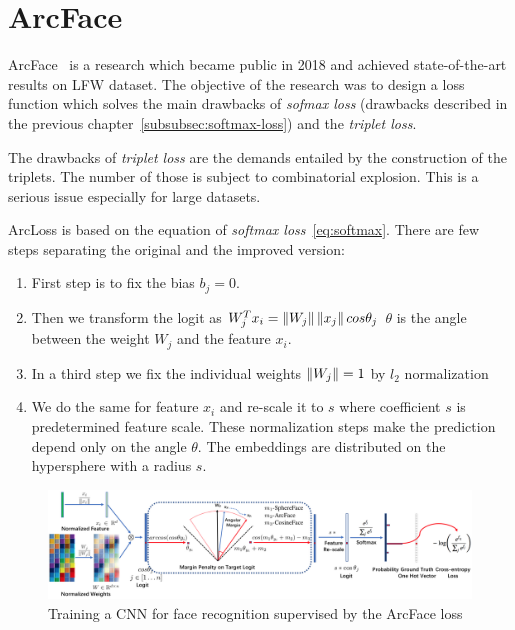 \chapter{ArcFace}\label{ch:arcface}
ArcFace~\cite{ArcFace} is a research which became public in 2018 and achieved state-of-the-art results on LFW dataset.
The objective of the research was to design a loss function which solves the main drawbacks of \textit{sofmax loss}
(drawbacks described in the previous chapter~\ref{subsubsec:softmax-loss}) and the \textit{triplet loss}.

The drawbacks of \textit{triplet loss} are the demands entailed by the construction of the triplets.
The number of those is subject to combinatorial explosion.
This is a serious issue especially for large datasets.

ArcLoss is based on the equation of \textit{softmax loss}~\ref{eq:softmax}.
There are few steps separating the original and the improved version:
\begin{enumerate}
    \item First step is to fix the bias $b_j = 0$.
    \item Then we transform the logit as $W_j^T x_i = \left\lVert W_j\right\rVert \left\lVert x_j\right\rVert cos \theta_j$
    $\theta$ is the angle between the weight $W_j$ and the feature $x_i$.
    \item In a third step we fix the individual weights $\left\lVert W_j\right\rVert = 1$ by $l_2$ normalization
    \item We do the same for feature $x_i$ and re-scale it to $s$ where coefficient $s$ is predetermined feature scale.
    These normalization steps make the prediction depend only on the angle $\theta$.
    The embeddings are distributed on the hypersphere with a radius $s$.
\end{enumerate}

\begin{figure}[H]
    \centering
    \includegraphics[width=\columnwidth]{images/arcface/arcface.png}
    \caption{Training a CNN for face recognition supervised by the ArcFace loss~\cite{ArcFace}}
    \label{fig:arcface}
\end{figure}